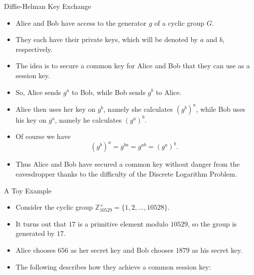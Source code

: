 \documentclass[ %
 10pt, xcolor={dvipsnames,svgnames,x11names,hyperref},
   hyperref={colorlinks=true,citecolor=green,linkcolor=DarkRed,urlcolor=ProcessBlue,anchorcolor=blue}
  ]{beamer}
\newenvironment{stepitemize}{\begin{itemize}[<+->]}{\end{itemize} }
\newcommand{\Z}{\mathbb{Z}}
\begin{document}
\begin{frame}{Diffie-Helman Key Exchange}
\begin{stepitemize}
\item Alice and Bob have access to the generator $g$ of a cyclic group $G$. 
\item They each have their private keys, which will be denoted by $a$ and $b$, respectively. 
\item The idea is to secure a common key for Alice and Bob that they can use as a session key. 
\item So, Alice sends $g^a$ to Bob, while Bob sends $g^b$ to Alice.
\item Alice then uses her key on $g^b$, namely she calculates
$(g^b)^a$, while Bob uses his key on $g^a$, namely he calculates $(g^a)^b$. 
\item Of course we have 
$$(g^b)^a=g^{ba} = g^{ab}=(g^a)^b.$$

\item Thus Alice and Bob have secured a common key without danger from the eavesdropper thanks to the difficulty of the Discrete Logarithm Problem.  
\end{stepitemize}    
\end{frame}

\begin{frame}{A Toy Example}
\begin{stepitemize}
\item Consider the cyclic group 
$\Z_{10529}^{\times} = \{1, 2, \dots, 10528\}. $
\item It turns out that $17$ is a primitive element modulo $10529$, so the group is generated by $17$.
 \item Alice chooses $656$ as her secret key and Bob chooses $1879$ as his secret key.
 \item The following describes how they achieve a common session key:

\end{stepitemize}
    
\end{frame}
\end{document}
